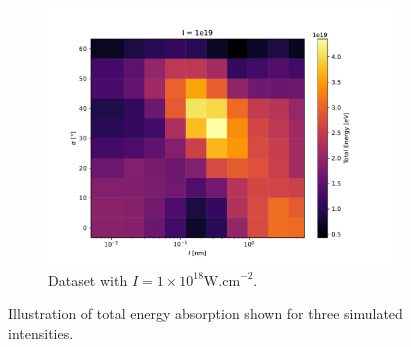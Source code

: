\begin{figure}[ht]
\begin{subfigure}{0.49\textwidth}
		\centering
		\includegraphics[width=\textwidth]{figures/I_1e19_cut_10}
		\caption{Dataset with $I = 1 \times 10^{18} \mathrm{W.cm}^{-2}$.}
		\label{fig:dataset2-c}
	\end{subfigure}
	\caption{Illustration of total energy absorption shown for three simulated intensities.}
	\label{fig:dataset2}
\end{figure}

